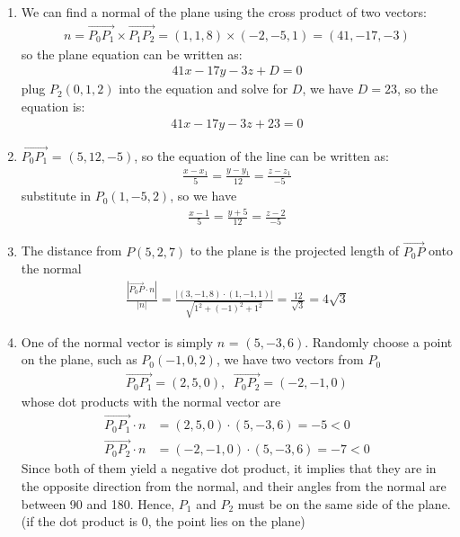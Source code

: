 \documentclass[11pt]{article}  %
\begin{document}
\solution
    \begin{enumerate}[leftmargin=*, topsep=0pt]
        \item We can find a normal of the plane using the cross product of two vectors:
        \begin{align*}
            n = \overrightarrow{P_0P_1} \times \overrightarrow{P_1P_2} = (1,1,8)\times(-2,-5,1) = (41,-17,-3)
        \end{align*}
        so the plane equation can be written as:
        \begin{align*}
            41x - 17y - 3z + D = 0
        \end{align*}
        plug $P_2(0,1,2)$ into the equation and solve for $D$, we have $D=23$, so the equation is:
        \begin{align*}
            41x - 17y - 3z + 23 = 0
        \end{align*}
        
        \item $\overrightarrow{P_0P_1}$ = $(5,12,-5)$, so the equation of the line can be written as:
        \begin{align*}
            \frac{x-x_1}{5} = \frac{y-y_1}{12} = \frac{z-z_1}{-5}
        \end{align*}
        substitute in $P_0(1,-5,2)$, so we have
        \begin{align*}
            \frac{x-1}{5} = \frac{y+5}{12} = \frac{z-2}{-5}
        \end{align*}

        \item The distance from $P(5,2,7)$ to the plane is the projected length of $\overrightarrow{P_0P}$ onto the normal
        \begin{align*}
            \frac{|\overrightarrow{P_0P} \cdot n|}{|n|} = \frac{|(3,-1,8) \cdot (1,-1,1)|}{\sqrt{1^2+(-1)^2+1^2}} = \frac{12}{\sqrt{3}} = 4\sqrt{3}
        \end{align*}

        \item One of the normal vector is simply $n$ = $(5,-3,6)$. Randomly choose a point on the plane, such as $P_0(-1,0,2)$, we have two vectors from $P_0$
        \begin{align*}
            \overrightarrow{P_0P_1} = (2,5,0),\;\; \overrightarrow{P_0P_2} = (-2,-1,0)
        \end{align*}
        whose dot products with the normal vector are
        \begin{align*}
            \overrightarrow{P_0P_1} \cdot n &= (2,5,0)\cdot(5,-3,6) = -5 < 0\\
            \overrightarrow{P_0P_2} \cdot n &= (-2,-1,0)\cdot(5,-3,6) = -7 < 0
        \end{align*}
        Since both of them yield a negative dot product, it implies that they are in the opposite direction from the normal, and their angles from the normal are between 90\textdegree\hspace{0mm} and 180\textdegree. Hence, $P_1$ and $P_2$ must be on the same side of the plane. (if the dot product is 0, the point lies on the plane)
    \end{enumerate}
\end{document}
